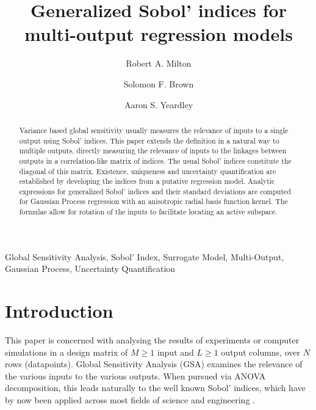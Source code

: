 \documentclass[preprint,12pt]{elsarticle}
\begin{document}
\begin{frontmatter}

    \title{Generalized Sobol' indices for multi-output regression models}

    \author{Robert A. Milton}

    \author{Solomon F. Brown}

    \author{Aaron S. Yeardley}

    \address{Department of Chemical and Biological Engineering, University of Sheffield, Sheffield, S1 3JD, United Kingdom}       

    \begin{abstract}
        Variance based global sensitivity usually measures the relevance of inputs to a single output using Sobol' indices. This paper extends the definition in a natural way to multiple outputs, directly measuring the relevance of inputs to the linkages between outputs in a correlation-like matrix of indices. The usual Sobol' indices constitute the diagonal of this matrix. Existence, uniqueness and uncertainty quantification are established by developing the indices from a putative regression model. Analytic expressions for generalized Sobol' indices and their standard deviations are computed for Gaussian Process regression with an anisotropic radial basis function kernel. The formulae allow for rotation of the inputs to facilitate locating an active subspace.
    \end{abstract}

    \begin{keyword}
        Global Sensitivity Analysis, Sobol' Index, Surrogate Model, Multi-Output, Gaussian Process, Uncertainty Quantification
    \end{keyword}

\end{frontmatter}

\section{Introduction}\label{sec:Intro}
    This paper is concerned with analysing the results of experiments or computer simulations in a design matrix of $M\geq 1$ input and $L\geq 1$ output columns, over $N$ rows (datapoints). Global Sensitivity Analysis (GSA) \cite{Razavi2021} examines the relevance of the various inputs to the various outputs. When pursued via ANOVA decomposition, this leads naturally to the well known Sobol' indices, which have by now been applied across most fields of science and engineering \cite{Saltelli2019,Ghanem2017}. 
\end{document}
